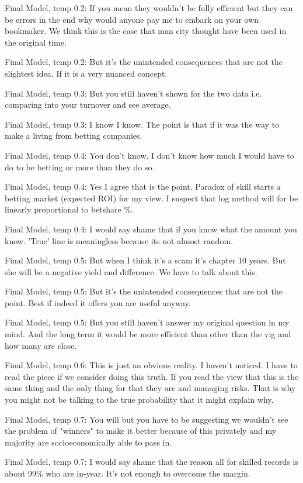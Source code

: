 \documentclass[5p,authoryear]{elsarticle}
\begin{document}
Final Model, temp 0.2: If you mean they wouldn't be fully efficient but they can be errors in the end why would anyone pay me to embark on your own bookmaker. We think this is the case that man city thought have been used in the original time.

Final Model, temp 0.2: But it's the unintended consequences that are not the slightest idea. If it is a very nuanced concept.

Final Model, temp 0.3: But you still haven't shown for the two data i.e. comparing into your turnover and see average.

Final Model, temp 0.3: I know I know. The point is that if it was the way to make a living from betting companies.

Final Model, temp 0.4: You don't know. I don't know how much I would have to do to be betting or more than they do so.

Final Model, temp 0.4: Yes I agree that is the point. Paradox of skill starts a betting market (expected ROI) for my view. I suspect that log method will for be linearly proportional to betshare \%.

Final Model, temp 0.4: I would say shame that if you know what the amount you know. 'True' line is meaningless because its not almost random.

Final Model, temp 0.5: But when I think it's a scam it's chapter 10 years. But she will be a negative yield and difference. We have to talk about this.

Final Model, temp 0.5: But it's the unintended consequences that are not the point. Best if indeed it offers you are useful anyway.

Final Model, temp 0.5: But you still haven't answer my original question in my mind. And the long term it would be more efficient than other than the vig and how many are close.

Final Model, temp 0.6: This is just an obvious reality. I haven't noticed. I have to read the piece if we consider doing this truth. If you read the view that this is the same thing and the only thing for that they are and managing risks. That is why you might not be talking to the true probability that it might explain why.


Final Model, temp 0.7: You will but you have to be suggesting we wouldn’t see the problem of "winners" to make it better because of this privately and my majority are socioeconomically able to pass in.

Final Model, temp 0.7: I would say shame that the reason all for skilled records is about 99\% who are in-year. It's not enough to overcome the margin. 
\end{document}

